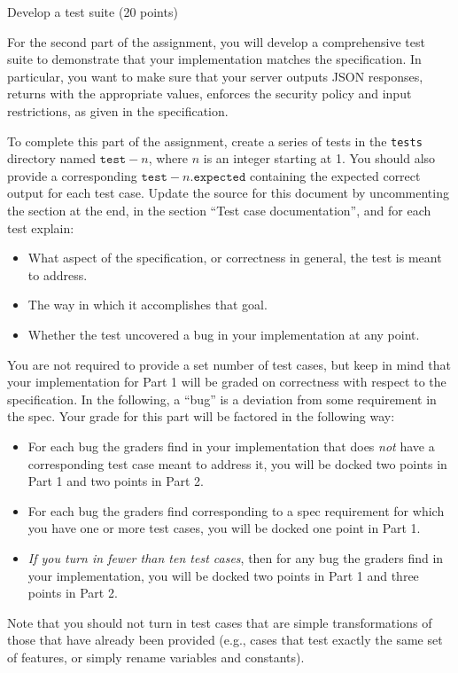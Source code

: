 \documentclass[11pt]{article}
\begin{document}
\newpage
\begin{problem}{Develop a test suite (20 points)}

For the second part of the assignment, you will develop a comprehensive test suite to demonstrate that your implementation matches the specification. In particular, you want to make sure that your server outputs JSON responses, returns with the appropriate values, enforces the security policy and input restrictions, as given in the specification. 

To complete this part of the assignment, create a series of tests in the \texttt{tests} directory named $\mathtt{test-}n$, where $n$ is an integer starting at 1. You should also provide a corresponding $\mathtt{test-}n\mathtt{.expected}$ containing the expected correct output for each test case. Update the source for this document by uncommenting the section at the end, in the section ``Test case documentation'', and for each test explain:
\begin{itemize}
\item What aspect of the specification, or correctness in general, the test is meant to address.
\item The way in which it accomplishes that goal.
\item Whether the test uncovered a bug in your implementation at any point.
\end{itemize}

You are not required to provide a set number of test cases, but keep in mind that your implementation for Part 1 will be graded on correctness with respect to the specification. In the following, a ``bug'' is a deviation from some requirement in the spec. Your grade for this part will be factored in the following way:
\begin{itemize}
\item For each bug the graders find in your implementation that does \emph{not} have a corresponding test case meant to address it, you will be docked two points in Part 1 and two points in Part 2.
\item For each bug the graders find corresponding to a spec requirement for which you have one or more test cases, you will be docked one point in Part 1.
\item \emph{If you turn in fewer than ten test cases}, then for any bug the graders find in your implementation, you will be docked two points in Part 1 and three points in Part 2.
\end{itemize}
Note that you should not turn in test cases that are simple transformations of those that have already been provided (e.g., cases that test exactly the same set of features, or simply rename variables and constants).


%
%

\end{problem}
\end{document}
